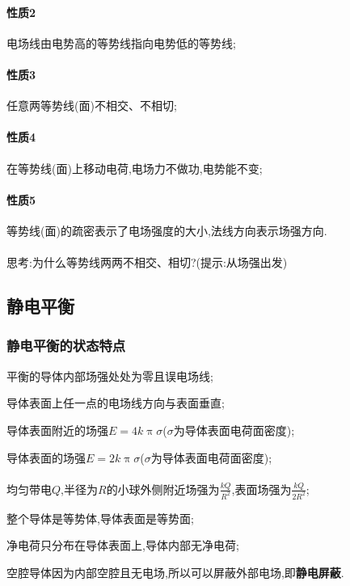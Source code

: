 \paragraph{性质2}\qquad 电场线由电势高的等势线指向电势低的等势线;
\paragraph{性质3}\qquad 任意两等势线(面)不相交、不相切;
\paragraph{性质4}\qquad 在等势线(面)上移动电荷,电场力不做功,电势能不变;
\paragraph{性质5}\qquad 等势线(面)的疏密表示了电场强度的大小,法线方向表示场强方向.\\\\
{ 思考:为什么等势线两两不相交、相切?(提示:从场强出发)}
\subsection{静电平衡}
\subsubsection{静电平衡的状态特点}
\begin{td}\qquad 平衡的导体内部场强处处为零且误电场线;\end{td}
\begin{td}\qquad 导体表面上任一点的电场线方向与表面垂直;\end{td}
\begin{td}\qquad 导体表面附近的场强$E=4k\uppi\sigma$($\sigma$为导体表面电荷面密度);\end{td}
\begin{td}\qquad 导体表面的场强$E=2k\uppi\sigma$($\sigma$为导体表面电荷面密度);  \end{td}
\paragraph{}
\begin{td}\qquad 均匀带电$Q$,半径为$R$的小球外侧附近场强为$\frac{kQ}{R^2}$,表面场强为$\frac{kQ}{2R^2}$;\end{td}
\begin{td}\qquad 整个导体是等势体,导体表面是等势面;\end{td}
\begin{td}\qquad 净电荷只分布在导体表面上,导体内部无净电荷;\end{td}
\begin{td}\qquad 空腔导体因为内部空腔且无电场,所以可以屏蔽外部电场,即\textbf{静电屏蔽}.\end{td}
